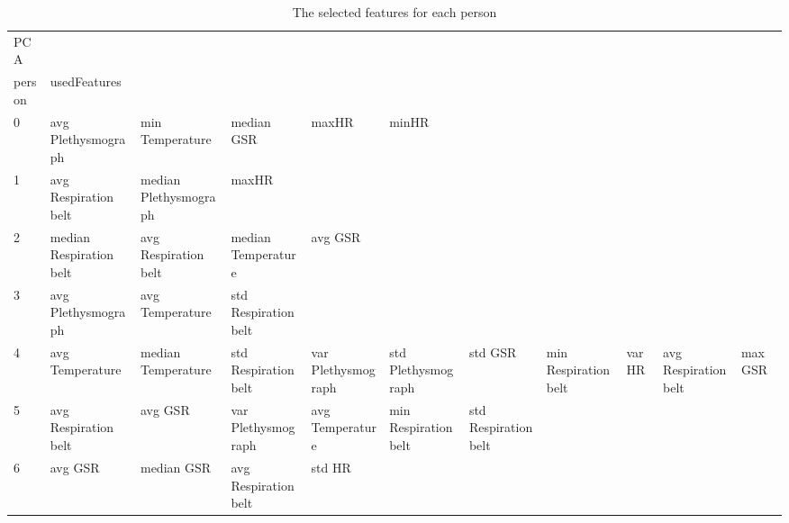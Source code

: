 \begin{landscape}
\begin{table}[]
\centering
\caption{The selected features for each person}
\begin{tabular}{l|llllllll}
PCA      &                         &                         &                         &                         &                         &                       &                         &                         &                         &         \\
person   & usedFeatures            &                         &                         &                         &                         &                       &                         &                         &                         &         \\
0        & avg Plethysmograph      & min Temperature         & median GSR              & maxHR                   & minHR                   &                       &                         &                         &                         &         \\
1        & avg Respiration belt    & median Plethysmograph   & maxHR                   &                         &                         &                       &                         &                         &                         &         \\
2        & median Respiration belt & avg Respiration belt    & median Temperature      & avg GSR                 &                         &                       &                         &                         &                         &         \\
3        & avg Plethysmograph      & avg Temperature         & std Respiration belt    &                         &                         &                       &                         &                         &                         &         \\
4        & avg Temperature         & median Temperature      & std Respiration belt    & var Plethysmograph      & std Plethysmograph      & std GSR               & min Respiration belt    & varHR                   & avg Respiration belt    & max GSR \\
5        & avg Respiration belt    & avg GSR                 & var Plethysmograph      & avg Temperature         & min Respiration belt    & std Respiration belt  &                         &                         &                         &         \\
6        & avg GSR                 & median GSR              & avg Respiration belt    & std HR                  &                         &                       &                         &                         &                         &         \\

\end{tabular}
\end{table}
\end{landscape}
